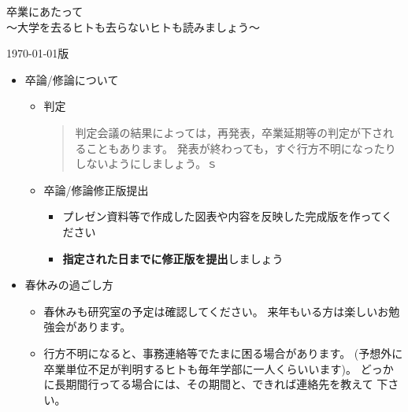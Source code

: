\documentclass[11pt]{jarticle}
\begin{document}
\pagestyle{empty}

\begin{center}
  {\LARGE 卒業にあたって}\\
  {\Large 〜大学を去るヒトも去らないヒトも読みましょう〜}
\end{center}
\begin{flushright}
{\today 版}
\end{flushright}

\begin{itemize}
\item 卒論/修論について
  \begin{itemize}
  \item 判定
  \begin{quote}
    判定会議の結果によっては，再発表，卒業延期等の判定が下されることもあります。
    発表が終わっても，すぐ行方不明になったりしないようにしましょう。ｓ
  \end{quote}
  \item 卒論/修論修正版提出
  \begin{itemize}
  \item プレゼン資料等で作成した図表や内容を反映した完成版を作ってください
  \item \textbf{指定された日までに修正版を提出}しましょう
  \end{itemize}
  \end{itemize}
\item 春休みの過ごし方
  \begin{itemize}
  \item 春休みも研究室の予定は確認してください。
    来年もいる方は楽しいお勉強会があります。
  \item  行方不明になると、事務連絡等でたまに困る場合があります。
    (予想外に卒業単位不足が判明するヒトも毎年学部に一人くらいいます)。
    どっかに長期間行ってる場合には、その期間と、できれば連絡先を教えて
    下さい。
  \end{itemize}


\end{itemize}
\end{document}
